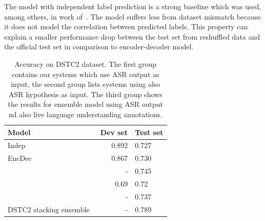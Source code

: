 \documentclass{itatnew}
\begin{document}
The model with independent label prediction is a strong baseline which was used, among others, in work of~\citet{zilka2015incremental}.
The model suffers less from dataset mismatch because it does not model the correlation between predicted labels.
This property can explain a smaller performance drop between the test set from reshuffled data and the official test set in comparison to encoder-decoder model.

\begin{table}
\vspace{-0.80em}
\begin{center}
\begin{tabular}{l@{\quad}rll}
\hline
\multicolumn{1}{l}{\rule{0pt}{12pt}
                   Model}&\multicolumn{1}{l}{Dev set}&\multicolumn{2}{l}{Test set}\\[2pt]
\hline\rule{0pt}{12pt}
    Indep  &   0.892 & 0.727 \\
    EncDec &   0.867 & 0.730 \\
\hline
    \citet{vodolan2015hybrid} & - & 0.745 \\
    \citet{zilka2015incremental} & 0.69 & 0.72 \\
    \citet{henderson2013deep} & - & 0.737 \\
\hline
    DSTC2 stacking ensemble~\cite{henderson2014second} & - & 0.789 \\
\hline
\end{tabular}
\caption{Accuracy on DSTC2 dataset. The first group contains our systems which use ASR output as input, the second group lists systems using also ASR hypothesis as input. The third group shows the results for ensemble model using ASR output nd also live language understanding annotations.}
\vspace{-2em}
\end{center}
\label{tab:dstc}
\end{table}
\end{document}
